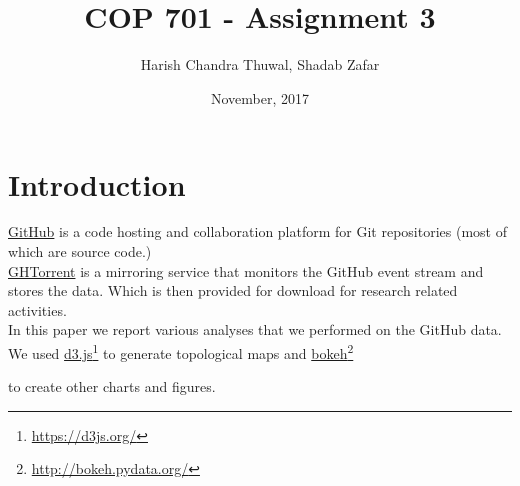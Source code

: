 \documentclass{article}
\title{
  \bold{Final Project Report} \\
  \large COP 701 - Assignment 3
}
\author{
    Harish Chandra Thuwal, Shadab Zafar
}
\date{November, 2017}
\newcommand\fnurl[2]{
    \href{#2}{#1}\footnote{\url{#2}}
}
\begin{document}
\maketitle

\vspace{15px}
\renewcommand{\baselinestretch}{1.35}\normalsize
\tableofcontents
\renewcommand{\baselinestretch}{1.0}\normalsize


\newpage
\section{Introduction}

\href{http://github.com/}{GitHub} is a code hosting and collaboration platform for Git repositories
(most of which are source code.) \\

\href{http://ghtorrent.org/}{GHTorrent} is a mirroring service that monitors the GitHub event stream and
stores the data. Which is then provided for download for research related
activities. \\

In this paper we report various analyses that we performed on the GitHub data. \\

We used \fnurl{d3.js}{https://d3js.org/} to generate topological maps and \fnurl{bokeh}{http://bokeh.pydata.org/}
to create other charts and figures.

\vspace{20px}


\end{document}
